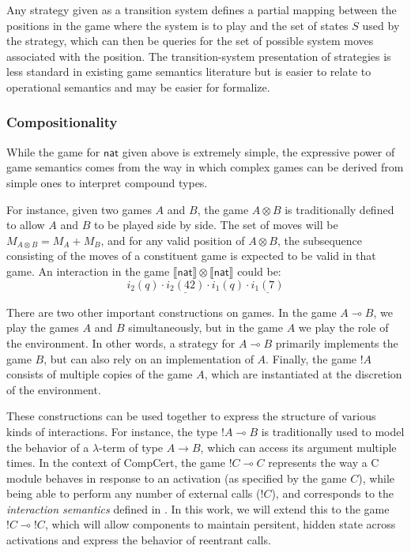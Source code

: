 \documentclass[acmsmall,timestamp,review]{acmart}
\newcommand{\kw}[1]{\ensuremath{ \mathsf{#1} }}
\begin{document}
Any strategy given as a transition system
defines a partial mapping between the positions in the game
where the system is to play
and the set of states $S$ used by the strategy,
which can then be queries for the set of possible
system moves associated with the position.
The transition-system presentation of strategies
is less standard in existing game semantics literature
but is easier to relate to operational semantics
and may be easier for formalize.

\subsubsection{Compositionality}

While the game for $\kw{nat}$ given above
is extremely simple,
the expressive power of game semantics
comes from the way in which complex games can be derived
from simple ones to interpret compound types.

For instance,
given two games $A$ and $B$,
the game $A \otimes B$ is traditionally defined
to allow $A$ and $B$ to be played side by side.
The set of moves will be $M_{A \otimes B} = M_A + M_B$,
and for any valid position of $A \otimes B$,
the subsequence consisting of the moves of a constituent game
is expected to be valid in that game.
An interaction in the game
$\llbracket \kw{nat} \rrbracket \otimes
 \llbracket \kw{nat} \rrbracket$ could be:
\[ i_2(q) \cdot \underline{i_2(42)} \cdot
   i_1(q) \cdot \underline{i_1(7)} \]

There are two other important constructions on games.
In the game $A \multimap B$,
we play the games $A$ and $B$ simultaneously,
but in the game $A$ we play the role of the environment.
In other words,
a strategy for $A \multimap B$
primarily implements the game $B$,
but can also rely on an implementation of $A$.
Finally,
the game $!A$
consists of multiple copies of the game $A$,
which are instantiated at the discretion of the environment.

These constructions can be used together
to express the structure of various kinds of interactions.
For instance,
the type $!A \multimap B$ is traditionally used
to model the behavior of a $\lambda$-term of type $A \rightarrow B$,
which can access its argument multiple times.
In the context of CompCert,
the game $!C \multimap C$
represents the way a C module behaves in response to an activation
(as specified by the game $C$),
while being able to perform any number of external calls ($!C$),
and corresponds to the \emph{interaction semantics} defined in
\cite{compcompcert}.
In this work,
we will extend this to the game $!C \multimap !C$,
which will allow components to maintain
persitent, hidden state across activations
and express the behavior of reentrant calls.
\end{document}
